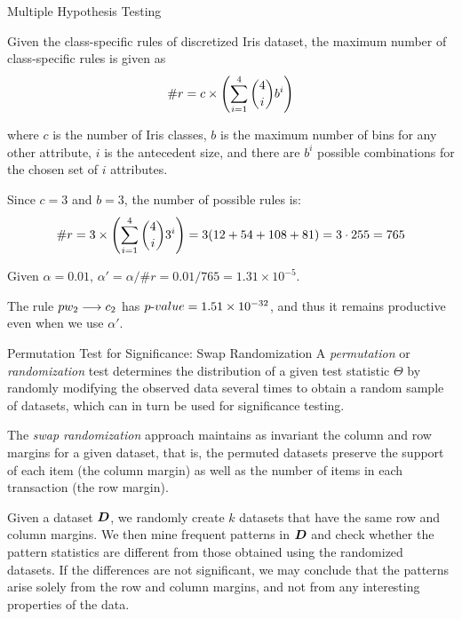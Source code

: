 \begin{frame}{Multiple Hypothesis Testing}

  Given the class-specif\/{i}c rules of discretized Iris dataset,
  the maximum number of class-specif\/{i}c rules 
  is given as
\begin{align*}
  \#r = c \times \left(\sum_{i=1}^4 {4\choose i} b^i\right)
\end{align*}

where $c$ is the number of Iris classes, $b$
is the maximum number of bins for any other attribute,
$i$ is the antecedent size,  and 
there are $b^i$ possible
combinations for the chosen set of $i$ attributes. 

\medskip

Since $c=3$ and $b=3$, the number of possible
rules is:
\begin{align*}
\#r= 3 \times \left(\sum_{i=1}^4 {4\choose i} 3^i\right) = 3(12+54+108+81)=
3\cdot 255= 765
\end{align*}

Given $\alpha=0.01$, $\alpha'=\alpha/\#r = 0.01/765 = 1.31\times10^{-5}$.

\medskip

The rule $pw_2 \arule c_2$ 
has ${p\text{-}value}=1.51 \times 10^{-32}$, and thus it remains productive even
when we use $\alpha'$.

\end{frame}

\ifdefined\wox \begin{frame} \titlepage \end{frame} \fi

\begin{frame}{Permutation Test for Significance: Swap Randomization}
A {\em permutation} or {\em randomization} test determines
the distribution of a given test statistic $\Theta$ by randomly
modifying the observed data several times to obtain a random
sample of datasets, which can in turn be used for signif\/{i}cance
testing. 


\medskip
The {\em swap randomization} approach
maintains as invariant the column and row margins for a given dataset,
that is, the permuted datasets preserve the support of each item (the
column margin) as well as the number of items in each transaction (the
row margin).  

\medskip
Given a dataset ${\boldsymbol D}$, we randomly create $k$
datasets that have the same row and column margins. We then mine
frequent patterns in ${\boldsymbol D}$ and check whether the pattern statistics are different
from those obtained using the randomized datasets. If the differences
are not signif\/{i}cant, we may conclude that the patterns arise solely from
the row and column margins, and not from any interesting properties of
the data.
\end{frame}


